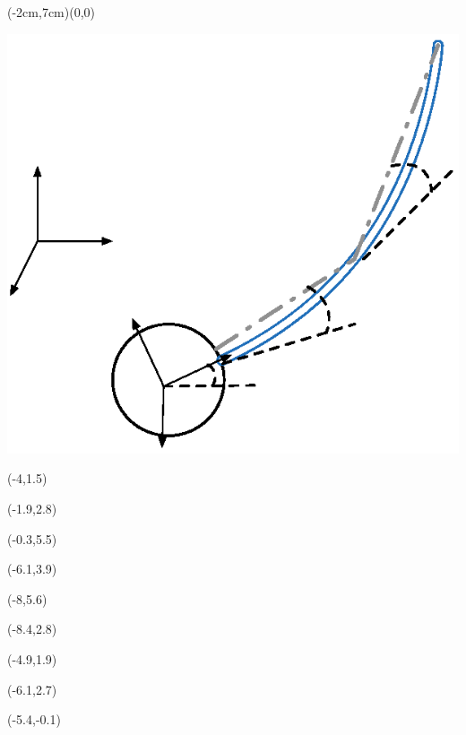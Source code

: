 \documentclass{article}
\begin{document}
\small

\begin{psdraw}(-2cm,7cm)(0,0)

\includegraphics[width=0.7\linewidth]{rotary_flexible_beam_3DOF.eps}


\move(-4,1.5)

\move(-1.9,2.8)

\move(-0.3,5.5)

\move(-6.1,3.9)

\move(-8,5.6)

\move(-8.4,2.8)

\move(-4.9,1.9)

\move(-6.1,2.7)

\move(-5.4,-0.1)

\end{psdraw}
\end{document}
